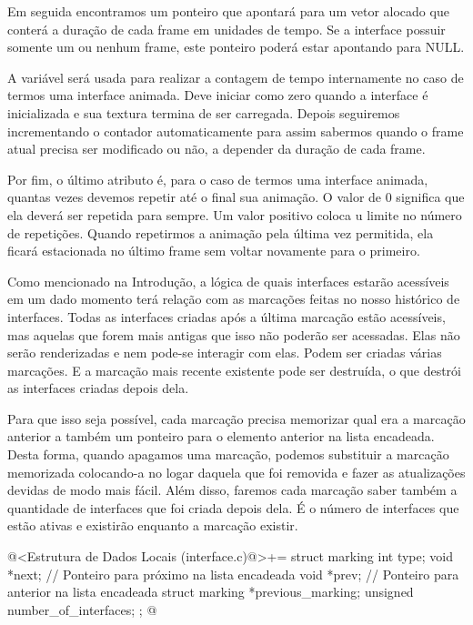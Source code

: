 Em seguida encontramos um ponteiro que apontará para um vetor alocado
que conterá a duração de cada frame em unidades de tempo. Se a
interface possuir somente um ou nenhum frame, este ponteiro poderá
estar apontando para NULL.

A variável  será usada para realizar a contagem de
tempo internamente no caso de termos uma interface animada. Deve
iniciar como zero quando a interface é inicializada e sua textura
termina de ser carregada. Depois seguiremos incrementando o contador
automaticamente para assim sabermos quando o frame atual precisa ser
modificado ou não, a depender da duração de cada frame.

Por fim, o último atributo é, para o caso de termos uma interface
animada, quantas vezes devemos repetir até o final sua animação. O
valor de 0 significa que ela deverá ser repetida para sempre. Um valor
positivo coloca u limite no número de repetições. Quando repetirmos a
animação pela última vez permitida, ela ficará estacionada no último
frame sem voltar novamente para o primeiro.


Como mencionado na Introdução, a lógica de quais interfaces estarão
acessíveis em um dado momento terá relação com as marcações feitas no
nosso histórico de interfaces. Todas as interfaces criadas após a
última marcação estão acessíveis, mas aquelas que forem mais antigas
que isso não poderão ser acessadas. Elas não serão renderizadas e
nem pode-se interagir com elas. Podem ser criadas várias marcações. E
a marcação mais recente existente pode ser destruída, o que destrói
as interfaces criadas depois dela.

Para que isso seja possível, cada marcação precisa memorizar qual era
a marcação anterior a também um ponteiro para o elemento anterior na
lista encadeada. Desta forma, quando apagamos uma marcação, podemos
substituir a marcação memorizada colocando-a no logar daquela que foi
removida e fazer as atualizações devidas de modo mais fácil. Além
disso, faremos cada marcação saber também a quantidade de interfaces
que foi criada depois dela. É o número de interfaces que estão ativas
e existirão enquanto a marcação existir.

\iniciocodigo
@<Estrutura de Dados Locais (interface.c)@>+=
struct marking {
  int type;
  void *next; // Ponteiro para próximo na lista encadeada
  void *prev; // Ponteiro para anterior na lista encadeada
  struct marking *previous_marking;
  unsigned number_of_interfaces;
};
@
\fimcodigo

